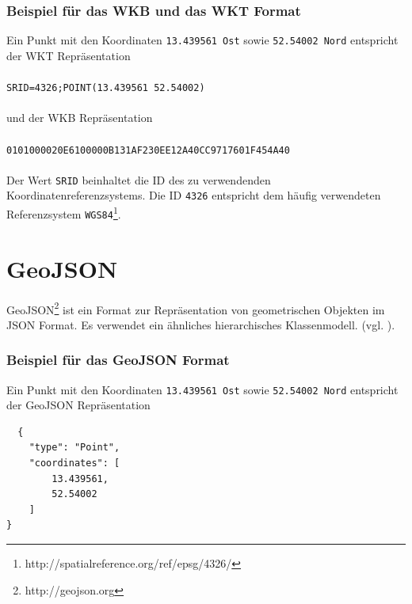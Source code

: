 \subsubsection{Beispiel für das WKB und das WKT Format}
Ein Punkt mit den Koordinaten \texttt{13.439561 Ost} sowie \texttt{52.54002 Nord} entspricht der WKT Repräsentation\\\\
\texttt{SRID=4326;POINT(13.439561 52.54002)}\\\\
und der WKB Repräsentation\\\\
\texttt{0101000020E6100000B131AF230EE12A40CC9717601F454A40}\\\\
Der Wert \texttt{SRID} beinhaltet die ID des zu verwendenden Koordinatenreferenzsystems.
Die ID \texttt{4326} entspricht dem häufig verwendeten Referenzsystem \texttt{WGS84}\footnote{http://spatialreference.org/ref/epsg/4326/}.  

\section{GeoJSON}
\label{sec:appendix:geojson}
GeoJSON\footnote{http://geojson.org} ist ein Format zur Repräsentation von geometrischen Objekten im JSON Format.
Es verwendet ein ähnliches hierarchisches Klassenmodell. (vgl. \cite{WEB:GEOJSON:Spec:2008}).

\subsubsection{Beispiel für das GeoJSON Format}
Ein Punkt mit den Koordinaten \texttt{13.439561 Ost} sowie \texttt{52.54002 Nord} entspricht der GeoJSON Repräsentation
\begin{lstlisting}
  {
    "type": "Point",
    "coordinates": [
        13.439561,
        52.54002
    ]
}
\end{lstlisting}

